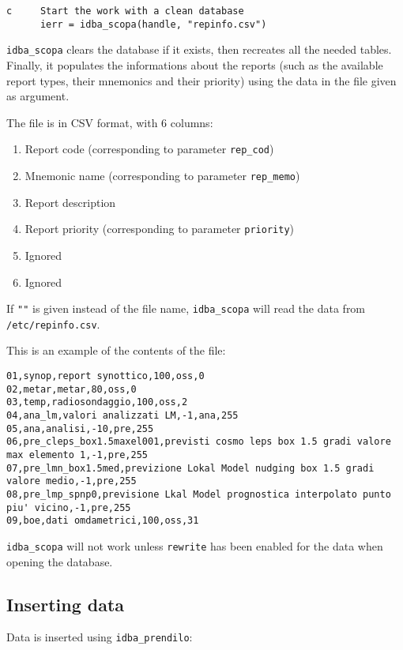 \documentclass[final,12pt,a4paper,twoside]{book}
\begin{document}
\begin{verbatim}
c     Start the work with a clean database
      ierr = idba_scopa(handle, "repinfo.csv")
\end{verbatim}

{\tt idba\_scopa} clears the database if it exists, then recreates all the
needed tables.  Finally, it populates the informations about the reports (such
as the available report types, their mnemonics and their priority) using the
data in the file given as argument.

The file is in CSV format, with 6 columns:
\begin{enumerate}
\item Report code (corresponding to parameter {\tt rep\_cod})
\item Mnemonic name (corresponding to parameter {\tt rep\_memo})
\item Report description
\item Report priority (corresponding to parameter {\tt priority})
\item Ignored
\item Ignored
\end{enumerate}

If {\tt ""} is given instead of the file name, {\tt idba\_scopa} will read the
data from {\tt /etc/repinfo.csv}.

This is an example of the contents of the file:

\begin{verbatim}
01,synop,report synottico,100,oss,0
02,metar,metar,80,oss,0
03,temp,radiosondaggio,100,oss,2
04,ana_lm,valori analizzati LM,-1,ana,255
05,ana,analisi,-10,pre,255
06,pre_cleps_box1.5maxel001,previsti cosmo leps box 1.5 gradi valore max elemento 1,-1,pre,255
07,pre_lmn_box1.5med,previzione Lokal Model nudging box 1.5 gradi valore medio,-1,pre,255
08,pre_lmp_spnp0,previsione Lkal Model prognostica interpolato punto piu' vicino,-1,pre,255
09,boe,dati omdametrici,100,oss,31
\end{verbatim}

{\tt idba\_scopa} will not work unless {\tt rewrite} has been enabled for the
data when opening the database.


\subsection {Inserting data}

Data is inserted using {\tt idba\_prendilo}:
\label{fun-idba_prendilo}
         
\end{document}
